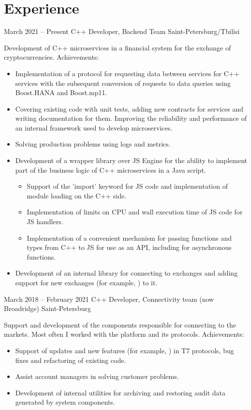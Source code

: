 \documentclass[11pt,a4paper,sans]{moderncv}
\begin{document}
\makecvtitle

\section{Experience}
\cventry
{March 2021 -- Present}
{C++ Developer, Backend Team}
{}
{Saint-Petersburg/Tbilisi}
{}
{Development of C++ microservices in a financial system for the exchange of cryptocurrencies.\newline{}
Achievements:
\begin{itemize}
\item Implementation of a protocol for requesting data between services for C++ services with the subsequent conversion of requests to data queries using Boost.HANA and Boost.mp11.
\item Covering existing code with unit tests, adding new contracts for services and writing documentation for them. Improving the reliability and performance of an internal framework used to develop microservices.
\item Solving production problems using logs and metrics.
\item Development of a wrapper library over  JS Engine for the ability to implement part of the business logic of C++ microservices in a Java script.
  \begin{itemize}
  \item Support of the 'import' keyword for JS code and implementation of module loading on the C++ side.
  \item Implementation of limits on CPU and wall execution time of JS code for JS handlers.
  \item Implementation of a convenient mechanism for passing functions and types from C++ to JS for use as an API, including for asynchronous functions.
  \end{itemize}
\item Development of an internal library for connecting to exchanges and adding support for new exchanges (for example, ) to it.
\end{itemize}}

\cventry
{March 2018 -- February 2021}
{C++ Developer, Connectivity team}
{(now Broadridge)}
{Saint-Petersburg}
{}
{Support and development of the components responsible for connecting to the markets. Most often I worked with the  platform and its protocols.\newline{}
Achievements:
\begin{itemize}
\item Support of updates and new features (for example, ) in T7 protocols, bug fixes and refactoring of existing code.
\item Assist account managers in solving customer problems.
\item Development of internal utilities for archiving and restoring audit data generated by system components.
\end{itemize}}
\end{document}
